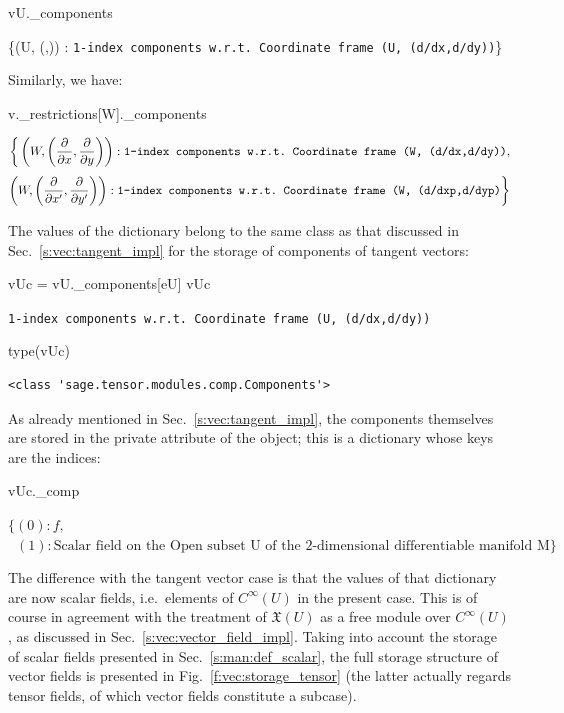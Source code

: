 \begin{NBin}
vU._components
\end{NBin}
\begin{NBoutM}
\left\{\left(U, \left(,\right)\right) :
\mbox{\texttt{1-index components w.r.t.~Coordinate frame (U, (d/dx,d/dy))}}\right\}
\end{NBoutM}
Similarly, we have:
\begin{NBin}
v._restrictions[W]._components
\end{NBin}
\begin{NBout}
\[
\bigg\{\left(W, \left(\frac{\partial}{\partial x },\frac{\partial}{\partial y }\right)\right) :
\mbox{\texttt{1-index components w.r.t.~Coordinate frame (W, (d/dx,d/dy))}},
\]
\[
\left(W, \left(\frac{\partial}{\partial {x'} },\frac{\partial}{\partial {y'} }\right)\right) :
\mbox{\texttt{1-index components w.r.t.~Coordinate frame (W, (d/dxp,d/dyp)}}
\bigg\}
\]
\end{NBout}
The values of the dictionary  belong to the same class
 as that discussed in Sec.~\ref{s:vec:tangent_impl} for
the storage of components of tangent vectors:
\begin{NBin}
vUc = vU._components[eU]
vUc
\end{NBin}
\begin{NBout}
\texttt{1-index components w.r.t.~Coordinate frame (U, (d/dx,d/dy))}
\end{NBout}
\vspace*{-\baselineskip}
\begin{NBin}
type(vUc)
\end{NBin}
\begin{NBout}
\begin{verbatim}
<class 'sage.tensor.modules.comp.Components'>
\end{verbatim}
\end{NBout}
As already mentioned in Sec.~\ref{s:vec:tangent_impl}, the components themselves are stored
in the private attribute  of the  object; this is a dictionary
whose keys are the indices:
\begin{NBin}
vUc._comp
\end{NBin}
\begin{NBout}
$\displaystyle
\big\{\left(0\right) : f, $\\
$\displaystyle
\phantom{x}\left(1\right) : \mbox{Scalar field on the Open subset U of the 2-dimensional differentiable manifold M}\big\}$
\end{NBout}
The difference with the tangent vector case is that the values of that dictionary are now scalar fields, i.e.\ elements of $C^\infty(U)$ in the present case. This is of course in agreement with the treatment of $\mathfrak{X}(U)$ as a free module over $C^\infty(U)$,
as discussed in Sec.~\ref{s:vec:vector_field_impl}.
Taking into account the storage of scalar fields presented in Sec.~\ref{s:man:def_scalar},
the full storage structure of vector fields is presented in Fig.~\ref{f:vec:storage_tensor}
(the latter actually regards tensor fields, of which vector fields constitute a subcase).

